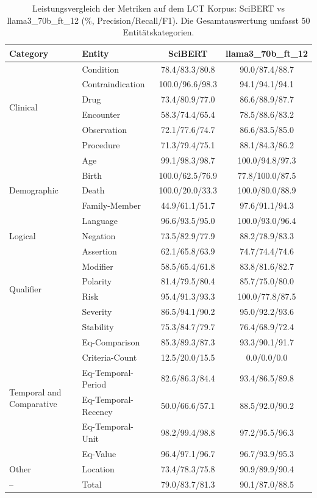 
\begin{table}[htbp]
\centering
\begin{tabular}{llcc}
\toprule
\textbf{Category} & \textbf{Entity} & \textbf{SciBERT} & \textbf{llama3_70b_ft_12} \\
\midrule
\multirow{6}{*}{Clinical} & Condition & 78.4/83.3/80.8 & 90.0/87.4/88.7 \\
 & Contraindication & 100.0/96.6/98.3 & 94.1/94.1/94.1 \\
 & Drug & 73.4/80.9/77.0 & 86.6/88.9/87.7 \\
 & Encounter & 58.3/74.4/65.4 & 78.5/88.6/83.2 \\
 & Observation & 72.1/77.6/74.7 & 86.6/83.5/85.0 \\
 & Procedure & 71.3/79.4/75.1 & 88.1/84.3/86.2 \\
\midrule
\multirow{5}{*}{Demographic} & Age & 99.1/98.3/98.7 & 100.0/94.8/97.3 \\
 & Birth & 100.0/62.5/76.9 & 77.8/100.0/87.5 \\
 & Death & 100.0/20.0/33.3 & 100.0/80.0/88.9 \\
 & Family-Member & 44.9/61.1/51.7 & 97.6/91.1/94.3 \\
 & Language & 96.6/93.5/95.0 & 100.0/93.0/96.4 \\
\midrule
Logical & Negation & 73.5/82.9/77.9 & 88.2/78.9/83.3 \\
\midrule
\multirow{6}{*}{Qualifier} & Assertion & 62.1/65.8/63.9 & 74.7/74.4/74.6 \\
 & Modifier & 58.5/65.4/61.8 & 83.8/81.6/82.7 \\
 & Polarity & 81.4/79.5/80.4 & 85.7/75.0/80.0 \\
 & Risk & 95.4/91.3/93.3 & 100.0/77.8/87.5 \\
 & Severity & 86.5/94.1/90.2 & 95.0/92.2/93.6 \\
 & Stability & 75.3/84.7/79.7 & 76.4/68.9/72.4 \\
\midrule
\multirow{6}{*}{Temporal and Comparative} & Eq-Comparison & 85.3/89.3/87.3 & 93.3/90.1/91.7 \\
 & Criteria-Count & 12.5/20.0/15.5 & 0.0/0.0/0.0 \\
 & Eq-Temporal-Period & 82.6/86.3/84.4 & 93.4/86.5/89.8 \\
 & Eq-Temporal-Recency & 50.0/66.6/57.1 & 88.5/92.0/90.2 \\
 & Eq-Temporal-Unit & 98.2/99.4/98.8 & 97.2/95.5/96.3 \\
 & Eq-Value & 96.4/97.1/96.7 & 96.7/93.9/95.3 \\
\midrule
Other & Location & 73.4/78.3/75.8 & 90.9/89.9/90.4 \\
\midrule
-- & Total & 79.0/83.7/81.3 & 90.1/87.0/88.5 \\
\bottomrule
\end{tabular}
\caption{Leistungsvergleich der Metriken auf dem LCT Korpus: SciBERT vs llama3_70b_ft_12 (\%, Precision/Recall/F1). Die Gesamtauswertung umfasst 50 Entitätskategorien.}
\label{tab:metrics_comparison}
\end{table}
    
